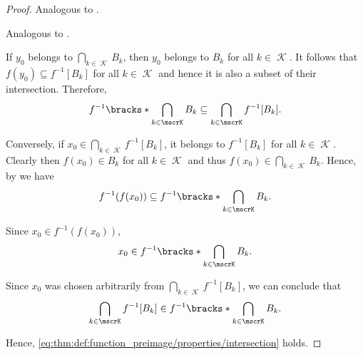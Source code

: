 \begin{proof}
   Analogous to .

   Analogous to .

   If \( y_0 \) belongs to \( \bigcap_{k \in \mscrK} B_k \), then \( y_0 \) belongs to \( B_k \) for all \( k \in \mscrK \). It follows that \( f(y_0) \subseteq f^{-1}[B_k] \) for all \( k \in \mscrK \) and hence it is also a subset of their intersection. Therefore,
  \begin{equation*}
    f^{-1} \bracks*{ \bigcap_{k \in \mscrK} B_k } \subseteq \bigcap_{k \in \mscrK} f^{-1}[B_k].
  \end{equation*}

  Conversely, if \( x_0 \in \bigcap_{k \in \mscrK} f^{-1}[B_k] \), it belongs to \( f^{-1}[B_k] \) for all \( k \in \mscrK \). Clearly then \( f(x_0) \in B_k \) for all \( k \in \mscrK \) and thus \( f(x_0) \in \bigcap_{k \in \mscrK} B_k \). Hence, by  we have
  \begin{equation*}
    f^{-1}(f(x_0))
    \subseteq
    f^{-1}\bracks*{ \bigcap_{k \in \mscrK} B_k }.
  \end{equation*}

  Since \( x_0 \in f^{-1}(f(x_0)) \),
  \begin{equation*}
    x_0 \in f^{-1}\bracks*{ \bigcap_{k \in \mscrK} B_k }.
  \end{equation*}

  Since \( x_0 \) was chosen arbitrarily from \( \bigcap_{k \in \mscrK} f^{-1}[B_k] \), we can conclude that
  \begin{equation*}
    \bigcap_{k \in \mscrK} f^{-1}[B_k] \in f^{-1}\bracks*{ \bigcap_{k \in \mscrK} B_k }.
  \end{equation*}

  Hence, \eqref{eq:thm:def:function_preimage/properties/intersection} holds.


\end{proof}
